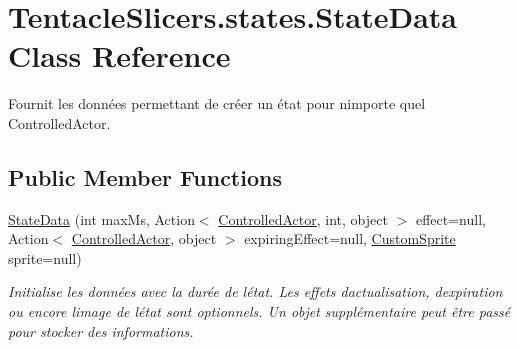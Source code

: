\hypertarget{class_tentacle_slicers_1_1states_1_1_state_data}{}\section{Tentacle\+Slicers.\+states.\+State\+Data Class Reference}
\label{class_tentacle_slicers_1_1states_1_1_state_data}


Fournit les données permettant de créer un état pour n\textquotesingle{}importe quel Controlled\+Actor.  


\subsection*{Public Member Functions}
\begin{DoxyCompactItemize}
\item 
\hyperlink{class_tentacle_slicers_1_1states_1_1_state_data_a35bc4e89e0575e63e4f53f7134581f2f}{State\+Data} (int max\+Ms, Action$<$ \hyperlink{class_tentacle_slicers_1_1actors_1_1_controlled_actor}{Controlled\+Actor}, int, object $>$ effect=null, Action$<$ \hyperlink{class_tentacle_slicers_1_1actors_1_1_controlled_actor}{Controlled\+Actor}, object $>$ expiring\+Effect=null, \hyperlink{class_tentacle_slicers_1_1graphics_1_1_custom_sprite}{Custom\+Sprite} sprite=null)
\begin{DoxyCompactList}\small\item\em Initialise les données avec la durée de l\textquotesingle{}état. Les effets d\textquotesingle{}actualisation, d\textquotesingle{}expiration ou encore l\textquotesingle{}image de l\textquotesingle{}état sont optionnels. Un objet supplémentaire peut être passé pour stocker des informations. \end{DoxyCompactList}\end{DoxyCompactItemize}
